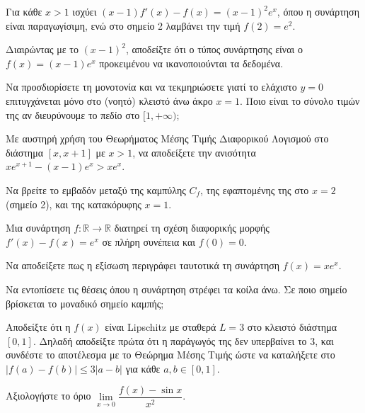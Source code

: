 \documentclass[a4paper,11pt,twoside]{article}
\def\xrwma{red!80!black}
\newcommand{\kerkissans}[1]{{\fontfamily{maksf}\selectfont {#1}}}
\newcommand\thema{Γ}
\newcounter{askhsh}[section]
\renewcommand{\theaskhsh}{\arabic{askhsh}}
\newcommand{\Askhsh}{\refstepcounter{askhsh}{\textbf{\textcolor{black}{\faPenSquare\ \  \large \kerkissans{\textbf{\theaskhshο\hspace{2mm}Θέμα}}}}}\hspace{0mm}}{}
\newenvironment{askhsh}[1]
{\begin{tcolorbox}[title=\Askhsh\kerkissans{\textbf{\large{  #1}}},breakable,
enhanced standard,titlerule=-.2pt,toprule=0pt, rightrule=0pt, bottomrule=0pt,
colback=white,left=2mm,top=1mm,bottom=0mm,
boxrule=0pt,
colframe=white,borderline west={1.5mm}{0pt}{\xrwma},leftrule=2mm,sharp corners,coltitle=black]
\renewcommand{\thema}{#1}}
{\end{tcolorbox}}
\begin{document}
\begin{askhsh}{Γ}
Για κάθε $x > 1$ ισχύει $(x-1) f'(x) - f(x) = (x-1)^2 e^x$, όπου η συνάρτηση είναι παραγωγίσιμη, ενώ στο σημείο 2 λαμβάνει την τιμή $f(2) = e^2$.
\begin{erwthma}
  \item Διαιρώντας με το $(x-1)^2$, αποδείξτε ότι ο τύπος συνάρτησης είναι ο $f(x) = (x-1)e^x$ προκειμένου να ικανοποιούνται τα δεδομένα.
  \item Να προσδιορίσετε τη μονοτονία και να τεκμηριώσετε γιατί το ελάχιστο $y=0$ επιτυγχάνεται μόνο στο (νοητό) κλειστό άνω άκρο $x=1$. Ποιο είναι το σύνολο τιμών της αν διευρύνουμε το πεδίο στο $[1, +\infty)$;
  \item Με αυστηρή χρήση του Θεωρήματος Μέσης Τιμής Διαφορικού Λογισμού στο διάστημα $[x, x+1]$ με $x > 1$, να αποδείξετε την ανισότητα  $x e^{x+1} - (x-1)e^x > x e^x$.
  \item Να βρείτε το εμβαδόν μεταξύ της καμπύλης $C_f$, της εφαπτομένης της στο $x=2$ (σημείο 2), και της κατακόρυφης $x=1$.
\end{erwthma}
\end{askhsh}

\begin{askhsh}{Γ}
Μια συνάρτηση $f: \mathbb{R} \to \mathbb{R}$ διατηρεί τη σχέση διαφορικής μορφής $f'(x) - f(x) = e^x$ σε πλήρη συνέπεια και $f(0) = 0$.
\begin{erwthma}
  \item Να αποδείξετε πως η εξίσωση περιγράφει ταυτοτικά τη συνάρτηση $f(x) = x e^x$.
  \item Να εντοπίσετε τις θέσεις όπου η συνάρτηση στρέφει τα κοίλα άνω. Σε ποιο σημείο βρίσκεται το μοναδικό σημείο καμπής;
  \item Αποδείξτε ότι η $f(x)$ είναι Lipschitz με σταθερά $L=3$ στο κλειστό διάστημα $[0, 1]$. Δηλαδή αποδείξτε πρώτα ότι η παράγωγός της δεν υπερβαίνει το 3, και συνδέστε το αποτέλεσμα με το Θεώρημα Μέσης Τιμής ώστε να καταλήξετε στο $|f(a)-f(b)| \le 3|a-b|$ για κάθε $a,b \in [0, 1]$.
  \item Αξιολογήστε το όριο $\lim\limits_{x \to 0} \dfrac{f(x) - \sin x}{x^2}$.
\end{erwthma}
\end{askhsh}
\end{document}
